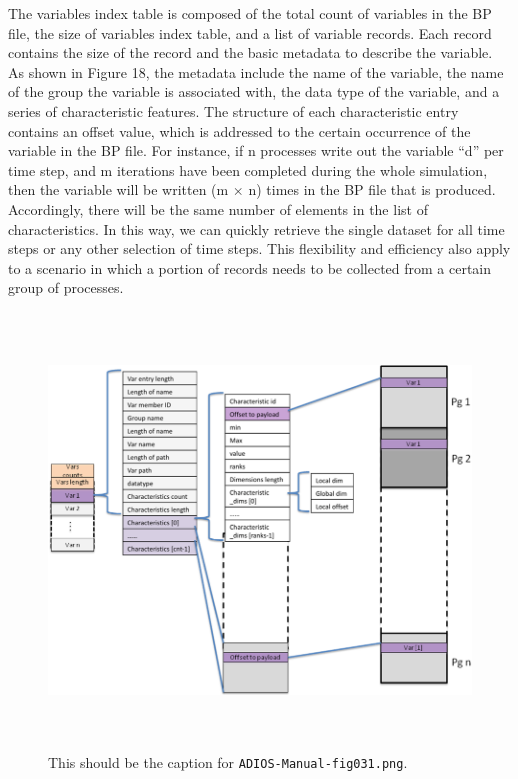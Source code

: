 \vspace{10pt}
The variables index table is composed of the total count of variables in the BP 
file, the size of variables index table, and a list of variable records. Each record 
contains the size of the record and the basic metadata to describe the variable. 
As shown in Figure 18, the metadata include the name of the variable, the name 
of the group the variable is associated with, the data type of the variable, and 
a series of characteristic features. The structure of each characteristic entry 
contains an offset value, which is addressed to the certain occurrence of the variable 
in the BP file. For instance, if n processes write out the variable ``d'' per time 
step, and m iterations have been completed during the whole simulation, then the 
variable will be written (m\textit{ }\ensuremath{\times} n) times in the BP file 
that is produced. Accordingly, there will be the same number of elements in the 
list of characteristics. In this way, we can quickly retrieve the single dataset 
for all time steps or any other selection of time steps. This flexibility and efficiency 
also apply to a scenario in which a portion of records needs to be collected from 
a certain group of processes. 

\begin{figure}[htbp]
\begin{center}
\includegraphics[width=420pt, height=327pt]{ADIOS-Manual-fig031.png}
\caption{This should be the caption for \texttt{ADIOS-Manual-fig031.png}.}
\end{center}
\end{figure}\label{HRef119578880}\label{HToc144350177}

